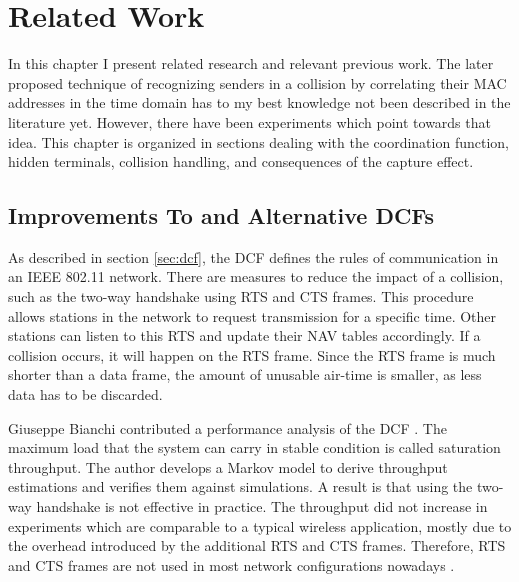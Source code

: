 
\chapter{Related Work}\label{ch:relatedwork}
\glsresetall %
 

In this chapter I present related research and relevant previous work. The later proposed technique of recognizing senders in a collision by correlating their \gls{MAC} addresses in the time domain has to my best knowledge not been described in the literature yet. However, there have been experiments which point towards that idea. This chapter is organized in sections dealing with the coordination function, hidden terminals, collision handling, and consequences of the capture effect.



\section{Improvements To and Alternative DCFs}\label{sec:related-dcf}

As described in section \ref{sec:dcf}, the \gls{DCF} defines the rules of communication in an IEEE 802.11 network. There are measures to reduce the impact of a collision, such as the two-way handshake using \gls{RTS} and \gls{CTS} frames. This procedure allows stations in the network to request transmission for a specific time. Other stations can listen to this \gls{RTS} and update their \gls{NAV} tables accordingly. If a collision occurs, it will happen on the \gls{RTS} frame. Since the \gls{RTS} frame is much shorter than a data frame, the amount of unusable air-time is smaller, as less data has to be discarded.

Giuseppe Bianchi contributed a performance analysis of the \gls{DCF} \cite{bianchi2000}. The maximum load that the system can carry in stable condition is called saturation throughput. The author develops a Markov model to derive throughput estimations and verifies them against simulations. A result is that using the two-way handshake is not effective in practice. The throughput did not increase in experiments which are comparable to a  typical wireless application, mostly due to the overhead introduced by the additional \gls{RTS} and \gls{CTS} frames. Therefore, \gls{RTS} and \gls{CTS} frames are not used in most network configurations nowadays \cite{bianchi2000, gollakota2008, choi2013}.\\

